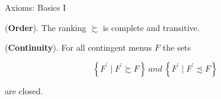 \documentclass[usenames,dvipsnames,aspectratio=169,11pt, envcountsect, handout]{beamer}
\begin{document}
\begin{frame}{Axioms: Basics I}

	\begin{axiom}\label{ax:orderapp}
		 (\textbf{Order}). The ranking \(\succsim\) is complete and transitive.

	\end{axiom}

	\vfill

	\begin{axiom}\label{ax:continuityapp}\label{axiomsb1}

		(\textbf{Continuity}). For all contingent menus \( F \) the sets

		\[
			\left\{ F^{\prime} \mid F^{\prime} \succsim F \right\} \: and \: \left\{ F^{\prime} \mid F^{\prime} \precsim F \right\}
		\]

		are closed.

	\end{axiom}

	\begin{flushright}
		\hyperlink{axiomsb1main}{}
	\end{flushright}

\end{frame}
\end{document}
